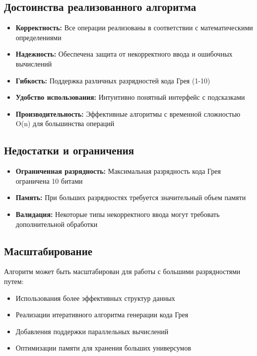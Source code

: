 \documentclass[12pt,a4paper]{article}
\begin{document}
\subsection{Достоинства реализованного алгоритма}

\begin{itemize}
    \item \textbf{Корректность:} Все операции реализованы в соответствии с математическими определениями
    \item \textbf{Надежность:} Обеспечена защита от некорректного ввода и ошибочных вычислений
    \item \textbf{Гибкость:} Поддержка различных разрядностей кода Грея (1-10)
    \item \textbf{Удобство использования:} Интуитивно понятный интерфейс с подсказками
    \item \textbf{Производительность:} Эффективные алгоритмы с временной сложностью O(n) для большинства операций
\end{itemize}

\subsection{Недостатки и ограничения}

\begin{itemize}
    \item \textbf{Ограниченная разрядность:} Максимальная разрядность кода Грея ограничена 10 битами
    \item \textbf{Память:} При больших разрядностях требуется значительный объем памяти
    \item \textbf{Валидация:} Некоторые типы некорректного ввода могут требовать дополнительной обработки
\end{itemize}

\subsection{Масштабирование}

Алгоритм может быть масштабирован для работы с большими разрядностями путем:
\begin{itemize}
    \item Использования более эффективных структур данных
    \item Реализации итеративного алгоритма генерации кода Грея
    \item Добавления поддержки параллельных вычислений
    \item Оптимизации памяти для хранения больших универсумов
\end{itemize}
\end{document}
